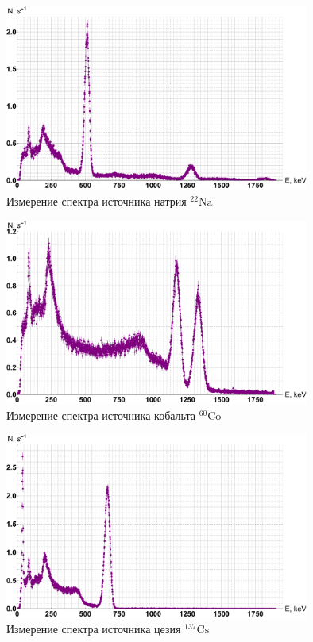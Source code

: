 \documentclass[12pt,a4paper]{article}
\begin{document}
\begin{figure}[H]
	\label{graf_na}
	\includegraphics[width=10cm]{src/na.pdf}
	\caption{Измерение спектра источника натрия $ \mathrm{^{22}Na} $}
\end{figure} 

\begin{figure}[H]
	\label{graf_co}
	\includegraphics[width=10cm]{src/co.pdf}
	\caption{Измерение спектра источника кобальта $ \mathrm{^{60}Co} $}
\end{figure} 
    
\begin{figure}[H]
	\label{graf_cs}
	\includegraphics[width=10cm]{src/cs.pdf}
	\caption{Измерение спектра источника цезия $ \mathrm{^{137}Cs} $}
\end{figure} 
    
\end{document}
